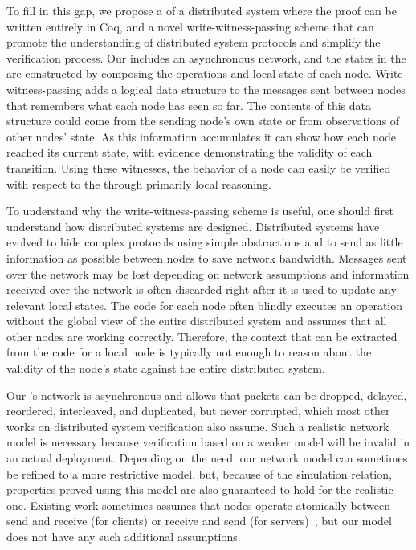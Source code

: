 To fill in this gap, we propose a \globalstate{} of a distributed system where the proof can be written entirely in Coq,
and a novel write-witness-passing scheme that can promote the understanding of distributed system protocols and simplify the verification process.
Our \globalstate{} includes an asynchronous network, and the states in the \globalstate{} are constructed by composing the operations and local state of each node.
Write-witness-passing adds a logical data structure to the messages sent between nodes that remembers what each node has seen so far.
The contents of this data structure could come from the sending node's own state or from observations of other nodes' state.
As this information accumulates it can show how each node reached its current state, with evidence demonstrating the validity of each transition.
Using these witnesses, the behavior of a node can easily be verified with respect to the \globalstate{} through primarily local reasoning.

To understand why the write-witness-passing scheme is useful, one should first understand how distributed systems are designed.
Distributed systems have evolved to hide complex protocols using simple abstractions and to send as little information as possible between nodes to save network bandwidth.
Messages sent over the network may be lost depending on network assumptions and information received over the network is often discarded right after it is used to update any relevant local states.
The code for each node often blindly executes an operation without the global view of the entire distributed system and assumes that all other nodes are working correctly.
Therefore, the context that can be extracted from the code for a local node is typically not enough to reason about the validity of the node's state against the entire distributed system.

Our \globalstate{}'s network is asynchronous and allows that packets can be dropped, delayed, reordered, interleaved, and duplicated, but never corrupted,
which most other works on distributed system verification also assume.
Such a realistic network model is necessary because verification based on a weaker model will be invalid in an actual deployment.
Depending on the need, our network model can sometimes be refined to a more restrictive model, but, because of the simulation relation,
properties proved using this model are also guaranteed to hold for the realistic one.
Existing work sometimes assumes that nodes operate atomically between send and receive (for clients) or receive and send (for servers)~\cite{verdi},
but our model does not have any such additional assumptions.

